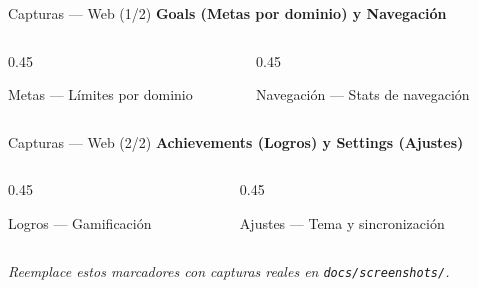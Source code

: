 \documentclass[aspectratio=169]{beamer}
\begin{document}
\begin{frame}{Capturas --- Web (1/2)}
  \centering
  \textbf{Goals (Metas por dominio) y Navegaci\'on}
  \vspace{0.3cm}

  \begin{columns}[T]
    \begin{column}{0.45\textwidth}
      \centering
      \par
      \tiny{Metas --- L\'imites por dominio}
    \end{column}
    \begin{column}{0.45\textwidth}
      \centering
      \par
      \tiny{Navegaci\'on --- Stats de navegaci\'on}
    \end{column}
  \end{columns}
\end{frame}

\begin{frame}{Capturas --- Web (2/2)}
  \centering
  \textbf{Achievements (Logros) y Settings (Ajustes)}
  \vspace{0.3cm}

  \begin{columns}[T]
    \begin{column}{0.45\textwidth}
      \centering
      \par
      \tiny{Logros --- Gamificaci\'on}
    \end{column}
    \begin{column}{0.45\textwidth}
      \centering
      \par
      \tiny{Ajustes --- Tema y sincronizaci\'on}
    \end{column}
  \end{columns}

  \vspace{0.3cm}
  \textit{Reemplace estos marcadores con capturas reales en \texttt{docs/screenshots/}.}
\end{frame}
\end{document}
